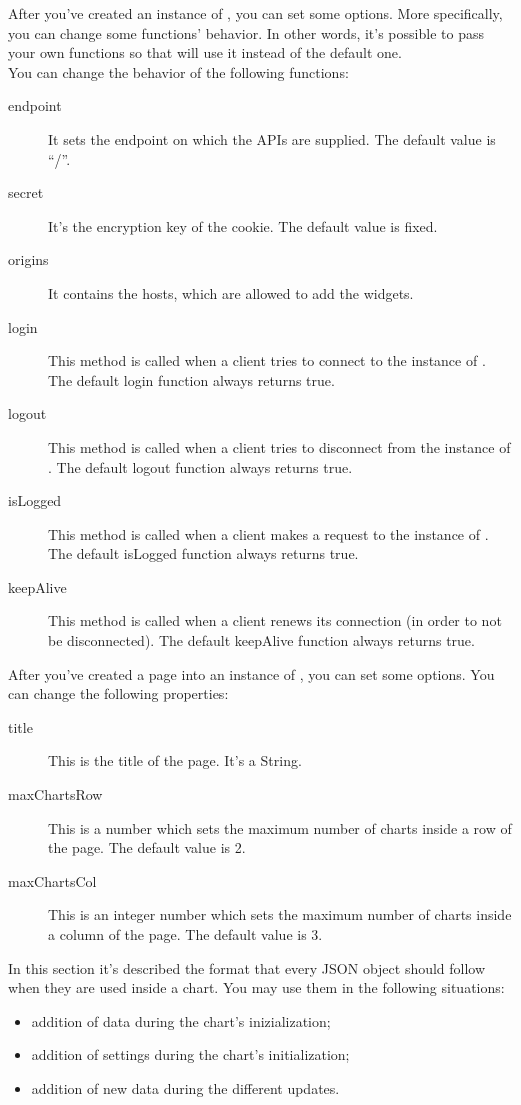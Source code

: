  \label{sec:ObjectsDescription}
	 \label{sec:ObjectsDescriptionNorris}
		After you've created an instance of , you can set some options. More specifically, you can change some functions' behavior. In other words, it's possible to pass your own functions so that  will use it instead of the default one.\\
		You can change the behavior of the following functions:
		\begin{description}
			\item[endpoint] It sets the endpoint on which the APIs are supplied. The default value is “/”.
			\item[secret] It's the encryption key of the cookie. The default value is fixed.
			\item[origins] It contains the hosts, which are allowed to add the widgets.
			\item[login] This method is called when a client tries to connect to the instance of . The default login function always returns true.
			\item[logout] This method is called when a client tries to disconnect from the instance of . The default logout function always returns true.
			\item[isLogged] This method is called when a client makes a request to the instance of . The default isLogged function always returns true.
			\item[keepAlive] This method is called when a client renews its connection (in order to not be disconnected). The default keepAlive function always returns true.
		\end{description}
		After you've created a page into an instance of , you can set some options. You can change the following properties:
		\begin{description}
			\item[title] This is the title of the page. It's a String.
			\item[maxChartsRow] This is a number which sets the maximum number of charts inside a row of the page. The default value is 2.
			\item[maxChartsCol] This is an integer number which sets the maximum number of charts inside a column of the page. The default value is 3.
		\end{description}
	 \label{sec:ObjectsDescriptionCharts}
		In this section it's described the format that every JSON object should follow when they are used inside a chart. You may use them in the following situations:
		\begin{itemize}
			\item addition of data during the chart's inizialization;
			\item addition of settings during the chart's initialization;
			\item addition of new data during the different updates.
		\end{itemize}

